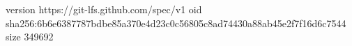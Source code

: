 version https://git-lfs.github.com/spec/v1
oid sha256:6b6e6387787bdbe85a370e4d23c0c56805c8ad74430a88ab45e2f7f16d6c7544
size 349692
